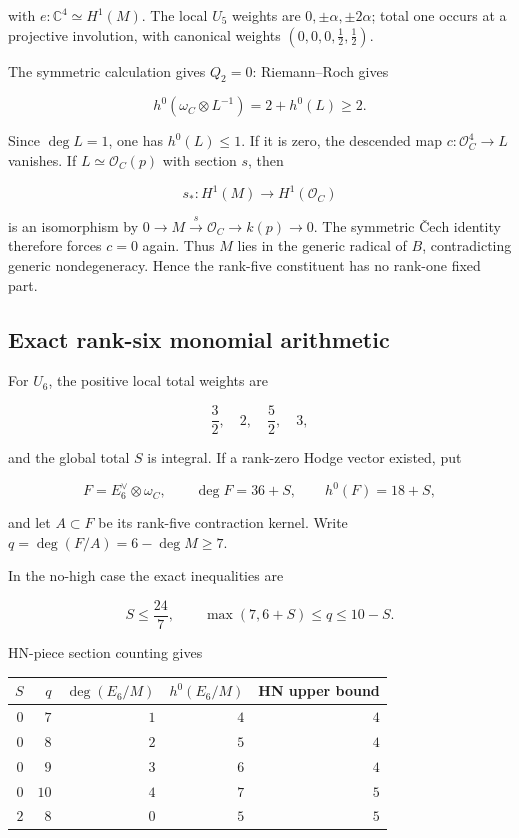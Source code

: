 \documentclass[11pt]{article}
\theoremstyle{definition}
\begin{document}
with \(e:\mathbb C^4\simeq H^1(M)\). The local \(U_5\) weights are
\(0,\pm\alpha,\pm2\alpha\); total one occurs at a projective involution,
with canonical weights \((0,0,0,\tfrac12,\tfrac12)\).

The symmetric calculation gives \(Q_2=0\): Riemann--Roch gives

\[h^0(\omega_C\otimes L^{-1})=2+h^0(L)\ge2.\]

Since \(\deg L=1\), one has \(h^0(L)\le1\). If it is zero, the descended
map \(c:\mathcal O_C^4\to L\) vanishes. If \(L\simeq\mathcal O_C(p)\)
with section \(s\), then

\[s_*:H^1(M)\longrightarrow H^1(\mathcal O_C)\]

is an isomorphism by \(0\to M\xrightarrow{s}\mathcal O_C\to k(p)\to0\).
The symmetric \v{C}ech identity therefore forces \(c=0\) again. Thus \(M\)
lies in the generic radical of \(B\), contradicting generic
nondegeneracy. Hence the rank-five constituent has no rank-one fixed
part.

\subsection{Exact rank-six monomial
arithmetic}\label{exact-rank-six-monomial-arithmetic}

For \(U_6\), the positive local total weights are

\[\frac32,\quad2,\quad\frac52,\quad3,\]

and the global total \(S\) is integral. If a rank-zero Hodge vector
existed, put

\[F=E_6^\vee\otimes\omega_C,
\qquad \deg F=36+S,
\qquad h^0(F)=18+S,\]

and let \(A\subset F\) be its rank-five contraction kernel. Write
\(q=\deg(F/A)=6-\deg M\ge7\).

In the no-high case the exact inequalities are

\[S\le\frac{24}{7},
\qquad
\max(7,6+S)\le q\le10-S.\]

HN-piece section counting gives

\begin{longtable}[]{@{}rrrrr@{}}
\toprule\noalign{}
\(S\) & \(q\) & \(\deg(E_6/M)\) & \(h^0(E_6/M)\) & HN upper bound \\
\midrule\noalign{}
\endhead
\bottomrule\noalign{}
\endlastfoot
\(0\) & \(7\) & \(1\) & \(4\) & \(4\) \\
\(0\) & \(8\) & \(2\) & \(5\) & \(4\) \\
\(0\) & \(9\) & \(3\) & \(6\) & \(4\) \\
\(0\) & \(10\) & \(4\) & \(7\) & \(5\) \\
\(2\) & \(8\) & \(0\) & \(5\) & \(5\) \\
\end{longtable}
\end{document}
